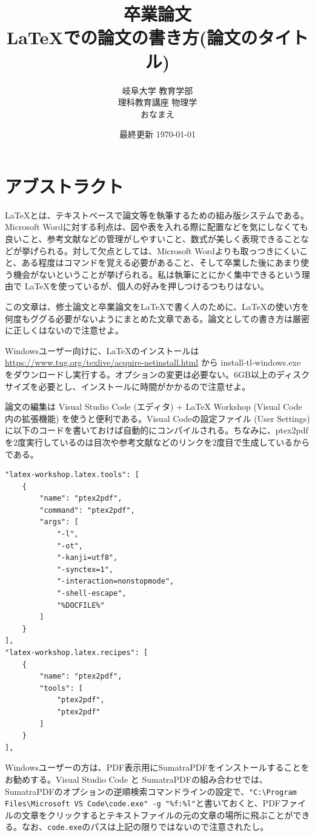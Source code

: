 \documentclass[a4j]{jsarticle}
\title{\vspace{60mm} \large 卒業論文\vspace{10mm}\\ \LARGE\LaTeX での論文の書き方(論文のタイトル)\vspace{5mm}}
\author{\large 岐阜大学 教育学部 \\ \vspace{5mm}
\large 理科教育講座 物理学 \\ \vspace{5mm}
\large おなまえ}
\date{最終更新 \today}
\begin{document}
\maketitle
\thispagestyle{empty} %
\newpage %
\tableofcontents %
\newpage %
\section*{アブストラクト}

\LaTeX とは、テキストベースで論文等を執筆するための組み版システムである。Microsoft Wordに対する利点は、図や表を入れる際に配置などを気にしなくても良いこと、参考文献などの管理がしやすいこと、数式が美しく表現できることなどが挙げられる。対して欠点としては、Microsoft Wordよりも取っつきにくいこと、ある程度はコマンドを覚える必要があること、そして卒業した後にあまり使う機会がないということが挙げられる。私は執筆にとにかく集中できるという理由で \LaTeX を使っているが、個人の好みを押しつけるつもりはない。

この文章は、修士論文と卒業論文を\LaTeX で書く人のために、\LaTeX の使い方を何度もググる必要がないようにまとめた文章である。論文としての書き方は厳密に正しくはないので注意せよ。

Windowsユーザー向けに、\LaTeX のインストールは \url{https://www.tug.org/texlive/acquire-netinstall.html} から install-tl-windows.exe をダウンロードし実行する。オプションの変更は必要ない。6GB以上のディスクサイズを必要とし、インストールに時間がかかるので注意せよ。

論文の編集は Visual Studio Code (エディタ) + LaTeX Workshop (Visual Code内の拡張機能) を使うと便利である。Visual Codeの設定ファイル (User Settings) に以下のコードを書いておけば自動的にコンパイルされる。ちなみに、ptex2pdfを2度実行しているのは目次や参考文献などのリンクを2度目で生成しているからである。
\begin{verbatim}
"latex-workshop.latex.tools": [
    {
        "name": "ptex2pdf",
        "command": "ptex2pdf",
        "args": [
            "-l",
            "-ot",
            "-kanji=utf8",
            "-synctex=1",
            "-interaction=nonstopmode",
            "-shell-escape",
            "%DOCFILE%"
        ]
    }
],
"latex-workshop.latex.recipes": [
    {
        "name": "ptex2pdf",
        "tools": [
            "ptex2pdf",
            "ptex2pdf"
        ]
    }
],
\end{verbatim}

Windowsユーザーの方は、PDF表示用にSumatraPDFをインストールすることをお勧めする。Visual Studio Code と SumatraPDFの組み合わせでは、SumatraPDFのオプションの逆順検索コマンドラインの設定で、\verb|"C:\Program Files\Microsoft VS Code\code.exe" -g "%f:%l"|と書いておくと、PDFファイルの文章をクリックするとテキストファイルの元の文章の場所に飛ぶことができる。なお、\verb|code.exe|のパスは上記の限りではないので注意されたし。
\end{document}
